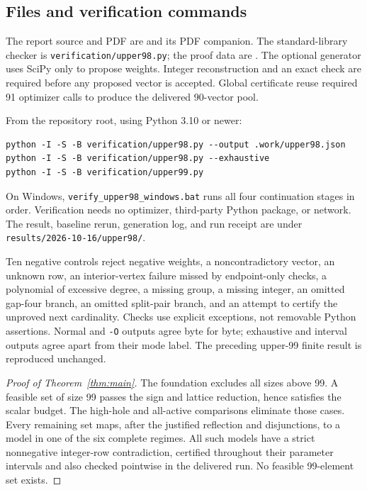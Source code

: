 \documentclass[11pt,a4paper]{article}
\begin{document}
\subsection{Files and verification commands}
The report source and PDF are
 and its PDF companion.
The standard-library checker is \texttt{verification/upper98.py}; the proof
data are . The optional generator
 uses SciPy only to
propose weights. Integer reconstruction and an exact check are required
before any proposed vector is accepted. Global certificate reuse required
91 optimizer calls to produce the delivered 90-vector pool.

From the repository root, using Python 3.10 or newer:
\begin{verbatim}
python -I -S -B verification/upper98.py --output .work/upper98.json
python -I -S -B verification/upper98.py --exhaustive
python -I -S -B verification/upper99.py
\end{verbatim}
On Windows, \texttt{verify\_upper98\_windows.bat} runs all four continuation
stages in order. Verification needs no optimizer, third-party Python
package, or network. The result, baseline rerun, generation log, and run
receipt are under \texttt{results/2026-10-16/upper98/}.

Ten negative controls reject negative weights, a noncontradictory vector,
an unknown row, an interior-vertex failure missed by endpoint-only checks,
a polynomial of excessive degree, a missing group, a missing integer,
an omitted gap-four branch, an omitted split-pair branch, and an attempt
to certify the unproved next cardinality. Checks use explicit exceptions,
not removable Python assertions. Normal and \texttt{-O} outputs agree
byte for byte; exhaustive and interval outputs agree apart from their mode
label. The preceding upper-99 finite result is reproduced unchanged.

\begin{proof}[Proof of Theorem~\ref{thm:main}]
The foundation excludes all sizes above 99. A feasible set of size 99
passes the sign and lattice reduction, hence satisfies the scalar budget.
The high-hole and all-active comparisons eliminate those cases.
Every remaining set maps, after the justified reflection and disjunctions,
to a model in one of the six complete regimes. All such models have a
strict nonnegative integer-row contradiction, certified throughout their
parameter intervals and also checked pointwise in the delivered run.
No feasible 99-element set exists.
\end{proof}
\end{document}

